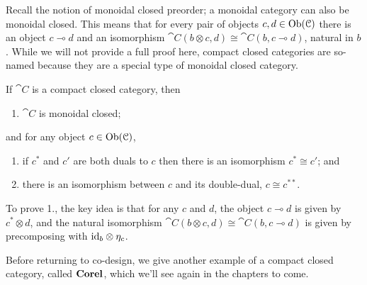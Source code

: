 \documentclass[7Sketches]{subfiles}
\begin{document}
Recall the notion of monoidal closed preorder; a monoidal category can also be monoidal
closed. This means that for every pair of objects $c,d\in\operatorname{Ob}(\mathcal{C})$ there is
an object $c\multimap d$ and an isomorphism $\cat{C}(b\otimes
c,d)\cong\cat{C}(b,c\multimap d)$, natural in $b$. While we will not provide a
full proof here, compact closed categories are so-named because they are a
special type of monoidal closed category.

\begin{proposition}%
\label{prop.double_dual}%
If $\cat{C}$ is a compact closed category, then
\begin{enumerate}
	\item $\cat{C}$ is monoidal closed;
\end{enumerate}
and for any object $c\in\operatorname{Ob}(\mathcal{C})$,
\begin{enumerate}[resume]
	\item if $c^*$ and $c'$ are both duals to $c$ then there is an
	isomorphism $c^*\cong c'$; and
	\item there is an isomorphism between $c$ and its double-dual, $c\cong c^{**}$.%
\end{enumerate}
\end{proposition}
To prove 1., the key idea is that for any $c$ and $d$, the object $c \multimap
d$ is given by $c^{*} \otimes d$, and the natural isomorphism $\cat{C}(b\otimes
c,d)\cong\cat{C}(b,c\multimap d)$ is given by precomposing with $\mathrm{id}_b\otimes
\eta_c$.

Before returning to co-design, we give another example of a compact closed
category, called $\mathbf{Corel}$, which we'll see again in the chapters to come.
\end{document}
